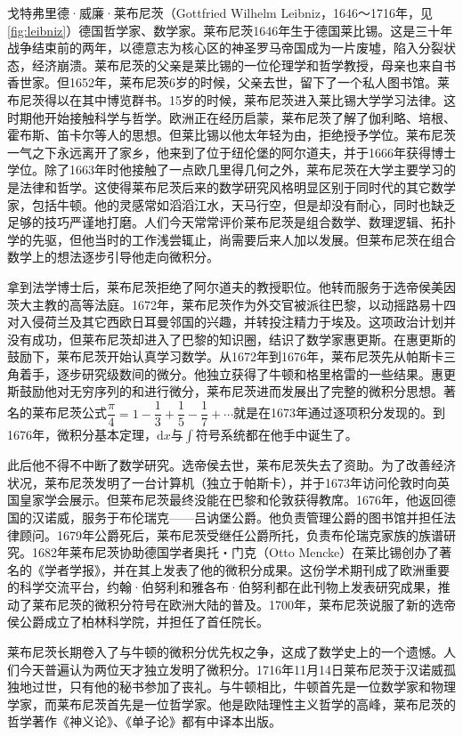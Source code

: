 \documentclass[b5paper]{ctexart}
\begin{document}
\begin{mdframed}
戈特弗里德·威廉·莱布尼茨（Gottfried Wilhelm Leibniz，1646～1716年，见\cref{fig:leibniz}）德国哲学家、数学家。莱布尼茨1646年生于德国莱比锡。这是三十年战争结束前的两年，以德意志为核心区的神圣罗马帝国成为一片废墟，陷入分裂状态，经济崩溃。莱布尼茨的父亲是莱比锡的一位伦理学和哲学教授，母亲也来自书香世家。但1652年，莱布尼茨6岁的时候，父亲去世，留下了一个私人图书馆。莱布尼茨得以在其中博览群书。15岁的时候，莱布尼茨进入莱比锡大学学习法律。这时期他开始接触科学与哲学。欧洲正在经历启蒙，莱布尼茨了解了伽利略、培根、霍布斯、笛卡尔等人的思想。但莱比锡以他太年轻为由，拒绝授予学位。莱布尼茨一气之下永远离开了家乡，他来到了位于纽伦堡的阿尔道夫，并于1666年获得博士学位。除了1663年时他接触了一点欧几里得几何之外，莱布尼茨在大学主要学习的是法律和哲学。这使得莱布尼茨后来的数学研究风格明显区别于同时代的其它数学家，包括牛顿。他的灵感常如滔滔江水，天马行空，但是却没有耐心，同时也缺乏足够的技巧严谨地打磨。人们今天常常评价莱布尼茨是组合数学、数理逻辑、拓扑学的先驱，但他当时的工作浅尝辄止，尚需要后来人加以发展。但莱布尼茨在组合数学上的想法逐步引导他走向微积分。

拿到法学博士后，莱布尼茨拒绝了阿尔道夫的教授职位。他转而服务于选帝侯美因茨大主教的高等法庭。1672年，莱布尼茨作为外交官被派往巴黎，以动摇路易十四对入侵荷兰及其它西欧日耳曼邻国的兴趣，并转投注精力于埃及。这项政治计划并没有成功，但莱布尼茨却进入了巴黎的知识圈，结识了数学家惠更斯。在惠更斯的鼓励下，莱布尼茨开始认真学习数学。从1672年到1676年，莱布尼茨先从帕斯卡三角着手，逐步研究级数间的微分。他独立获得了牛顿和格里格雷的一些结果。惠更斯鼓励他对无穷序列的和进行微分，莱布尼茨进而发展出了完整的微积分思想。著名的莱布尼茨公式$\dfrac{\pi}{4} = 1 - \dfrac{1}{3} + \dfrac{1}{5} - \dfrac{1}{7} + \dotsb$就是在1673年通过逐项积分发现的。到1676年，微积分基本定理，$\mathrm{d} x$与$\int$符号系统都在他手中诞生了。

此后他不得不中断了数学研究。选帝侯去世，莱布尼茨失去了资助。为了改善经济状况，莱布尼茨发明了一台计算机（独立于帕斯卡），并于1673年访问伦敦时向英国皇家学会展示。但莱布尼茨最终没能在巴黎和伦敦获得教席。1676年，他返回德国的汉诺威，服务于布伦瑞克——吕讷堡公爵。他负责管理公爵的图书馆并担任法律顾问。1679年公爵死后，莱布尼茨受继任公爵所托，负责布伦瑞克家族的族谱研究。1682年莱布尼茨协助德国学者奥托・门克（Otto Mencke）在莱比锡创办了著名的《学者学报》，并在其上发表了他的微积分成果。这份学术期刊成了欧洲重要的科学交流平台，约翰·伯努利和雅各布·伯努利都在此刊物上发表研究成果，推动了莱布尼茨的微积分符号在欧洲大陆的普及。1700年，莱布尼茨说服了新的选帝侯公爵成立了柏林科学院，并担任了首任院长。

莱布尼茨长期卷入了与牛顿的微积分优先权之争，这成了数学史上的一个遗憾。人们今天普遍认为两位天才独立发明了微积分。1716年11月14日莱布尼茨于汉诺威孤独地过世，只有他的秘书参加了丧礼。与牛顿相比，牛顿首先是一位数学家和物理学家，而莱布尼茨首先是一位哲学家。他是欧陆理性主义哲学的高峰，莱布尼茨的哲学著作《神义论》、《单子论》都有中译本出版。
\end{mdframed}
\end{document}
